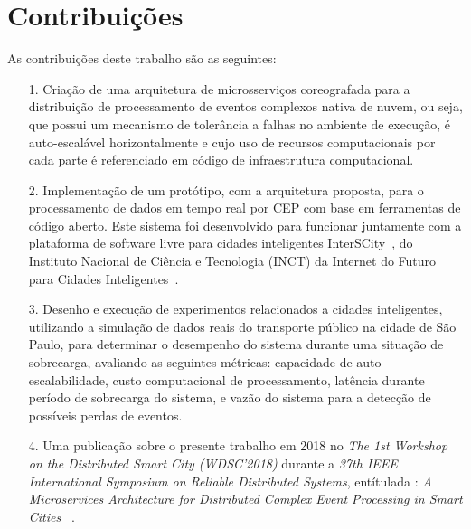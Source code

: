 \section{Contribuições}
\label{sec:contribucoes}
As contribuições deste trabalho são as seguintes:

\begin{itemize}
  \item[1.] Criação de uma arquitetura de microsserviços coreografada para a distribuição de processamento de eventos complexos nativa de nuvem, ou seja, que possui um mecanismo de tolerância a falhas no ambiente de execução, é auto-escalável horizontalmente e cujo uso de recursos computacionais por cada parte é referenciado em código de infraestrutura computacional.

  
  \item[2.] Implementação de um protótipo, com a arquitetura proposta, para o processamento de dados em tempo real por CEP com base em ferramentas de código aberto. Este sistema foi desenvolvido para funcionar juntamente com a plataforma de software livre para cidades inteligentes InterSCity~\citep{del2019design}, do Instituto Nacional de Ciência e Tecnologia (INCT) da Internet do Futuro para Cidades Inteligentes~\citep{Interscitysite}.
  
  
  \item[3.] Desenho e execução de experimentos relacionados a cidades inteligentes, utilizando a simulação de dados reais do transporte público na cidade de São Paulo, para determinar o desempenho do sistema durante uma situação de sobrecarga, avaliando as seguintes métricas: capacidade de auto-escalabilidade, custo computacional de processamento, latência  durante período de sobrecarga do sistema, e vazão do sistema para a detecção de possíveis perdas de eventos.
  
  \item[4.] Uma publicação sobre o presente trabalho em 2018 no \textit{The 1st Workshop on the Distributed Smart City (WDSC'2018)} durante a \textit{37th IEEE International Symposium on Reliable Distributed Systems}, entítulada : \textit{A Microservices Architecture for Distributed Complex Event Processing in Smart Cities} ~\citep{8615650}.
  

\end{itemize}
